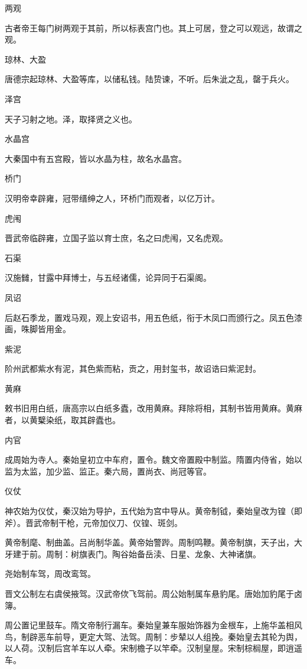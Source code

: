 \documentclass[a4paper,12pt,UTF8,twoside]{ctexbook}
\begin{document}
    两观
    
    古者帝王每门树两观于其前，所以标表宫门也。其上可居，登之可以观远，故谓之观。
    
    琼林、大盈
    
    唐德宗起琼林、大盈等库，以储私钱。陆贽谏，不听。后朱泚之乱，罄于兵火。
    
    泽宫
    
    天子习射之地。泽，取择贤之义也。
    
    水晶宫
    
    大秦国中有五宫殿，皆以水晶为柱，故名水晶宫。
    
    桥门
    
    汉明帝幸辟雍，冠带缙绅之人，环桥门而观者，以亿万计。
    
    虎闱
    
    晋武帝临辟雍，立国子监以育士庶，名之曰虎闱，又名虎观。
    
    石渠
    
    汉施雠，甘露中拜博士，与五经诸儒，论异同于石渠阁。
    
    凤诏
    
    后赵石季龙，置戏马观，观上安诏书，用五色纸，衔于木凤口而颁行之。凤五色漆画，咮脚皆用金。
    
    紫泥
    
    阶州武都紫水有泥，其色紫而粘，贡之，用封玺书，故诏诰曰紫泥封。
    
    黄麻
    
    敕书旧用白纸，唐高宗以白纸多蠹，改用黄麻。拜除将相，其制书皆用黄麻。黄麻者，以黄櫱染纸，取其辟蠹也。
    
    内官
    
    成周始为寺人。秦始皇初立中车府，置令。魏文帝置殿中制监。隋置内侍省，始以监为太监，加少监、监正。秦六局，置尚衣、尚冠等官。
    
    仪仗
    
    神农始为仪仗，秦汉始为导护，五代始为宫中导从。黄帝制钺，秦始皇改为锽（即斧）。晋武帝制干枪，元帝加仪刀、仪锽、斑剑。
    
    黄帝制麾、制曲盖。吕尚制华盖。黄帝始警跸。周制鸣鞭。黄帝制旗，天子出，大牙建于前。周制：树旗表门。陶谷始备岳渎、日星、龙象、大神诸旗。
    
    尧始制车驾，周改鸾驾。
    
    晋文公制左右虞侯掖驾。汉武帝佽飞驾前。周公始制属车悬豹尾。唐始加豹尾于卤簿。
    
    周公置记里鼓车。隋文帝制行漏车。秦始皇兼车服始饰器为金根车，上施华盖相风鸟，制辟恶车前导，更定大驾、法驾。周制：步辇以人组挽。秦始皇去其轮为舆，以人荷。汉制后宫羊车以人牵。宋制檐子以竿牵。汉制皇屋。宋制棕榈屋，即逍遥车。
    
\end{document}

